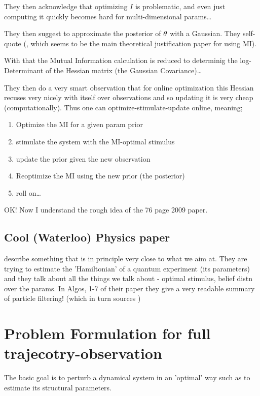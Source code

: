 They then acknowledge that optimizing $I$ is problematic, and even just
computing it quickly becomes hard for multi-dimensional params\ldots

They then suggest to approximate the posterior of ${ \theta}$ with a Gaussian. They
self-quote (\cite{Paninski2005}, which seems to be the main theoretical
justification paper for using MI).

With that the Mutual Information calculation is reduced to determinig the
log-Determinant of the Hessian matrix (the Gaussian Covariance)\ldots

They then do a very smart observation that for online optimization this Hessian
recuses very nicely with itself over observations and so updating it is very
cheap (computationally). Thus one can optimize-stimulate-update online, meaning;

\begin{enumerate}
  \item Optimize the MI for a given param prior
  \item stimulate the system with the MI-optimal stimulus
  \item update the prior given the new observation
  \item Reoptimize the MI using the new prior (the posterior)
  \item roll on\ldots
\end{enumerate}

OK! Now I understand the rough idea of the 76 page 2009 paper\cite{Lewi2009}.

\subsection{Cool (Waterloo) Physics paper}
\cite{Granade2012} describe something that is in principle very close to what we
aim at. They are trying to estimate the 'Hamiltonian' of a quantum experiment
(its parameters) and they talk about all the things we talk about - optimal
stimulus, belief distn over the params. In Algos, 1-7 of their paper they give a
very readable summary of particle filtering! (which in turn sources
\cite{Liu2001})

\section{Problem Formulation for full trajecotry-observation}
The basic goal is to perturb a dynamical system in an 'optimal' way such as to
estimate its structural parameters. 

